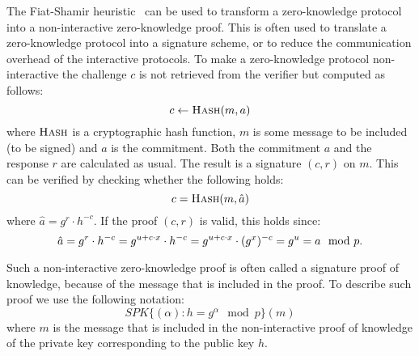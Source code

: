 The Fiat-Shamir heuristic~\cite{FiatShamir1987} can be used to transform a
zero-knowledge protocol into a non-interactive zero-knowledge proof. This is
often used to translate a zero-knowledge protocol into a signature scheme, or to
reduce the communication overhead of the interactive protocols. To make a
zero-knowledge protocol non-interactive the challenge $c$ is not retrieved from
the verifier but computed as follows:
\begin{equation*}
  c \gets \Call{Hash}{m, a}
\end{equation*}
where $\Call{Hash}{}$ is a cryptographic hash function, $m$ is some message to
be included (to be signed) and $a$ is the commitment. Both the commitment $a$
and the response $r$ are calculated as usual. The result is a signature $(c, r)$
on $m$. This can be verified by checking whether the following holds:
\begin{equation*}
  c = \Call{Hash}{m, \hat{a}}
\end{equation*}
where $\hat{a} = g^r \cdot h^{-c}$. If the proof $(c, r)$ is valid, this holds
since:
\begin{equation*}
  \hat{a} = g^r \cdot h^{-c} = g^{u + c \cdot x} \cdot h^{-c} = g^{u + c\cdot x} \cdot (g^x)^{-c} = g^u = a \mod p\text.
\end{equation*}

Such a non-interactive zero-knowledge proof is often called a signature proof of
knowledge, because of the message that is included in the proof. To describe
such proof we use the following notation:
\begin{equation*}
  SPK\{(\alpha) : h = g^{\alpha} \mod p \}(m)
\end{equation*}
where $m$ is the message that is included in the non-interactive proof of
knowledge of the private key corresponding to the public key $h$.
